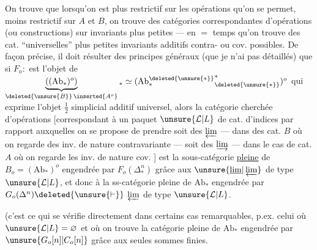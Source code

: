 On trouve que lorsqu'on est plus
restrictif sur les opérations qu'on
se permet,  moins restrictif
sur $A$ et $B$, on trouve des catégories
correspondantes d'opérations (ou constructions)
sur invariants plus petites --- 
en $=$ temps qu'on trouve des cat.
``universelles'' plus petites 
invariants additifs contra- ou cov.
possibles. \unsure{\&} De façon précise, il doit
résulter des principes généraux (que je
n'ai pas détaillés) que si  $F_o:$ \deleted{$\unsure{\widehat{\boldsymbol\Delta}}$}
est l'objet de
$\underbrace{((\mathrm{Ab}_*)^o)}_{\deleted{\unsure{B}}\,\inserted{A^o}}{}_*
\simeq({\mathrm{Ab}^{\deleted{\unsure{*}}}_*}^{*}_{\deleted{\unsure{*}}})^o$
qui exprime l'objet $\frac12$ simplicial
additif universel, alors la  catégorie
cherchée d'opérations [correspondant à
un paquet $\unsure{\mathcal L|L}$ de cat. d'indices par
rapport auxquelles on se propose de
prendre soit des $\varprojlim$ --- dans des cat.
$B$ où on regarde des inv. de nature
contravariante --- soit des $\varinjlim$ --- dans
le cas de cat. $A$ où on regarde les inv. de
nature cov. ] est la sous-catégorie \uline{pleine}
de $B_o=(\mathrm{Ab}_*)^o$ engendrée par $F_o(\Delta_*^n)$ grâce
aux $\unsure{\underline{\lim}|\varprojlim}$ de type $\unsure{\mathcal L|L}$, et 
donc à la ss-catégorie pleine de $\mathrm{Ab}_*$
engendrée par  $G_o(\Delta^n)\deleted{\unsure{\vdash}}$  $\varprojlim$ de type $\unsure{\mathcal L|L}$.

(c’est ce qui se vérifie directement dans certains cas remarquables, p.ex. celui où $\unsure{\mathcal L|L}=\varnothing$ et où on trouve la catégorie pleine de $\mathrm{Ab}_*$ engendrée par  $\unsure{G_o[n]|C_o[n]}$ grâce aux seules sommes finies.

